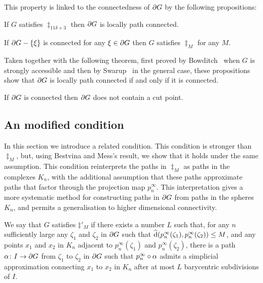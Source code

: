 \documentclass[a4paper]{article}
\begin{document}
This property is linked to the connectedness of $\partial G$ by the following
propositions:

\begin{proposition}\cite[Proposition 3.2]{bestvinamess91}
  If $G$ satisfies $\ddag_{11\delta + 3}$ then $\partial G$ is locally path
  connected.
\end{proposition}

\begin{proposition}
  If $\partial G - \left\{\xi\right\}$ is connected for any $\xi \in \partial G$ then
  $G$ satisfies $\ddag_M$ for any $M$.
\end{proposition}

Taken together with the following theorem, first proved by
Bowditch~\cite{bowditch98b} when $G$ is strongly accessible and then by
Swarup~\cite{swarup96} in the general case, these propositions show that
$\partial G$ is locally path connected if and only if it is connected.

\begin{theorem}\cite{bowditch98b,swarup96}
  If $\partial G$ is connected then $\partial G$ does not contain a cut
  point.
\end{theorem}

\subsection{An modified condition}

In this section we introduce a related condition. This condition is stronger
than $\ddag_M$, but, using Bestvina and Mess's result, we show that it holds
under the same assumption. This condition reinterprets the paths in $\ddag_M$
as paths in the complexes $K_n$, with the additional assumption that these
paths approximate paths that factor through the projection map $p^\infty_n$.
This interpretation gives a more systematic method for constructing paths in
$\partial G$ from paths in the spheres $K_n$, and permits a generalisation to
higher dimensional connectivity.

\begin{definition}
  We say that $G$ satisfies $\ddag'_M$ if there exists a number $L$ such that,
  for any $n$ sufficiently large any $\zeta_1$ and $\zeta_2$ in $\partial G$
  such that $\operatorname{\widehat{d}}(p^\infty_n(\zeta_1), p^\infty_n(\zeta_2)) \leq M$, and
  any points $x_1$ and $x_2$ in $K_n$ adjacent to $p^\infty_n(\zeta_1)$ and
  $p^\infty_n(\zeta_2)$, there is a path $\alpha\colon I\to \partial G$ from
  $\zeta_1$ to $\zeta_2$ in $\partial G$ such that $p^\infty_n\circ\alpha$
  admits a simplicial approximation connecting $x_1$ to $x_2$ in $K_n$ after at
  most $L$ barycentric subdivisions of $I$.
\end{definition}
\end{document}
